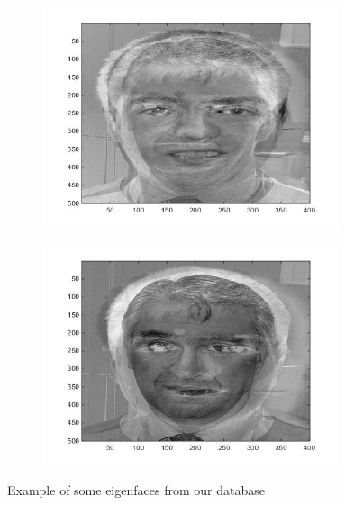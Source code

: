 \begin{figure}[H]
\begin{subfigure}{.24\textwidth}
  \caption{}
\end{subfigure}%
\begin{subfigure}{.24\textwidth}
  \centering
  \includegraphics[width=0.95\textwidth]{img/fr/eigenface3.jpg}
  \caption{}
\end{subfigure}%
\begin{subfigure}{.24\textwidth}
  \centering
  \includegraphics[width=0.95\textwidth]{img/fr/eigenface4.jpg}
  \caption{}
\end{subfigure}%

\caption{Example of some eigenfaces from our database}
\label{fig:eigenface}
\end{figure}
